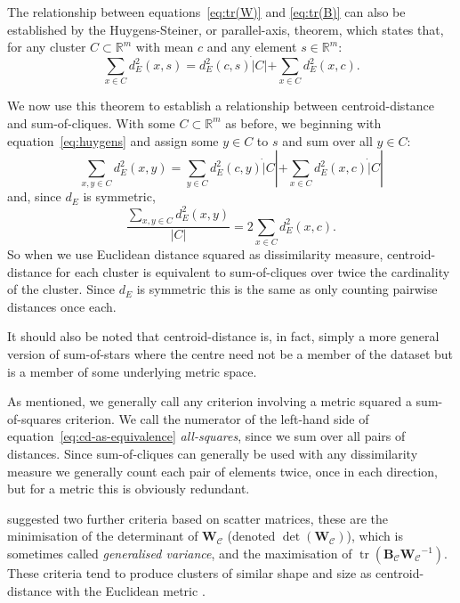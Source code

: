 \documentclass[a4paper]{report}
\DeclareMathOperator*{\tr}{tr}
\newcommand{\clus}{\mathcal{C}}
\begin{document}
The relationship between equations~\eqref{eq:tr(W)} and \eqref{eq:tr(B)} can
also be established by the Huygens-Steiner, or parallel-axis, theorem, which
states that, for any cluster $C \subset \mathbb{R}^m$ with mean $c$ and any
element $s \in \mathbb{R}^m$:
\begin{equation}
  \label{eq:huygens}
  \sum_{x \in C} d_E^2(x,s) = d_E^2(c,s) \dot |C| +
                             \sum_{x \in C} d_E^2(x,c).
\end{equation}

We now use this theorem to establish a relationship between centroid-distance
and sum-of-cliques.  With some $C \subset \mathbb{R}^m$ as before, we
beginning with equation~\eqref{eq:huygens} and assign some $y \in C$ to $s$
and sum over all $y \in C$:
\begin{equation*}
  \sum_{x,y \in C} d_E^2(x,y) = \sum_{y \in C} d_E^2(c,y) \dot |C|
                           + \sum_{x \in C} d_E^2(x,c) \dot |C|
\end{equation*}
and, since $d_E$ is symmetric,
\begin{equation}
  \label{eq:cd-as-equivalence}
  \frac{\displaystyle \sum_{x,y \in C} d_E^2(x,y)}
       {|C|}
  = 2 \sum_{x \in C} d_E^2(x,c).
\end{equation}
So when we use Euclidean distance squared as dissimilarity measure,
centroid-distance for each cluster is equivalent to sum-of-cliques over twice
the cardinality of the cluster.  Since $d_E$ is symmetric this is the same as
only counting pairwise distances once each.

It should also be noted that centroid-distance is, in fact, simply a more
general version of sum-of-stars where the centre need not be a member of the
dataset but is a member of some underlying metric space.

As mentioned, we generally call any criterion involving a metric squared a
sum-of-squares criterion.  We call the numerator of the left-hand side of
equation~\eqref{eq:cd-as-equivalence} \textit{all-squares}, since we sum over
all pairs of distances.  Since sum-of-cliques can generally be used with any
dissimilarity measure we generally count each pair of elements twice, once in
each direction, but for a metric this is obviously redundant.

\citet{friedman1967criteria} suggested two further criteria based on scatter
matrices, these are the minimisation of the determinant of
$\mathbf{W_{\clus}}$ (denoted $\det(\mathbf{W}_{\clus})$), which is sometimes
called \textit{generalised variance}, and the maximisation of
$\tr(\mathbf{B_{\clus}W_{\clus}}^{-1})$.  These criteria tend to produce
clusters of similar shape and size as centroid-distance with the Euclidean
metric \citep{marriott1982optimization}.
\end{document}
